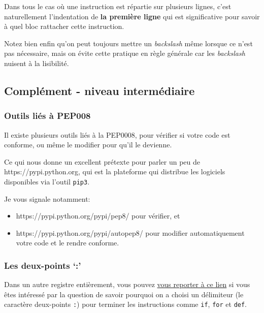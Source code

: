     Dans tous le cas où une instruction est répartie sur plusieurs lignes,
c'est naturellement l'indentation de \textbf{la première ligne} qui est
significative pour savoir à quel bloc rattacher cette instruction.

    Notez bien enfin qu'on peut toujours mettre un \emph{backslash} même
lorsque ce n'est pas nécessaire, mais on évite cette pratique en règle
générale car les \emph{backslash} nuisent à la lisibilité.

    \hypertarget{compluxe9ment---niveau-intermuxe9diaire}{%
\subsection{Complément - niveau
intermédiaire}\label{compluxe9ment---niveau-intermuxe9diaire}}

    \hypertarget{outils-liuxe9s-uxe0-pep008}{%
\subsubsection{Outils liés à PEP008}\label{outils-liuxe9s-uxe0-pep008}}

Il existe plusieurs outils liés à la PEP0008, pour vérifier si votre
code est conforme, ou même le modifier pour qu'il le devienne.

Ce qui nous donne un excellent prétexte pour parler un peu de
https://pypi.python.org, qui est la plateforme qui distribue les
logiciels disponibles via l'outil \texttt{pip3}.

Je vous signale notamment:

\begin{itemize}
\tightlist
\item
  https://pypi.python.org/pypi/pep8/ pour vérifier, et
\item
  https://pypi.python.org/pypi/autopep8/ pour modifier automatiquement
  votre code et le rendre conforme.
\end{itemize}

    \hypertarget{les-deux-points}{%
\subsubsection{Les deux-points `:'}\label{les-deux-points}}

    Dans un autre registre entièrement, vous pouvez
\href{https://docs.python.org/3/faq/design.html\#why-are-colons-required-for-the-if-while-def-class-statements}{vous
reporter à ce lien} si vous êtes intéressé par la question de savoir
pourquoi on a choisi un délimiteur (le caractère deux-points \texttt{:})
pour terminer les instructions comme \texttt{if}, \texttt{for} et
\texttt{def}.


    
    
    
